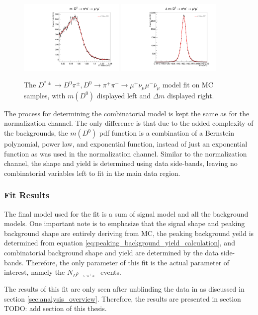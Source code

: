 \begin{figure}[htp]
    \begin{center}
      \includegraphics[width=0.45\textwidth]{figures/chapter4/signal_fit/d0pipimm_2022_2023_0_m.pdf}
      \includegraphics[width=0.45\textwidth]{figures/chapter4/signal_fit/d0pipimm_2022_2023_0_dm.pdf}\\
    \end{center}
    \caption{
      The $D^{*\pm} \to D^0\pi^\pm, D^0 \to \pi^+ \pi^- \to \mu^+ \nu_\mu \mu^- \bar{\nu}_\mu$ model fit on MC samples, with $m(D^0)$ displayed left and $\Delta m$ displayed right.
    }
    \label{fig:d0munumunu_uml_fit}
\end{figure}


The process for determining the combinatorial model is kept the same as for the normalization channel. The only difference is that due to the added complexity of the backgrounds, the $m(D^0)$ pdf function is a combination of a Bernstein polynomial, power law, and exponential function, instead of just an exponential function as was used in the normalization channel. Similar to the normalization channel, the shape and yield is determined using data side-bands, leaving no combinatorial variables left to fit in the main data region.

\subsubsection{Fit Results}

The final model used for the fit is a sum of signal model and all the background models. One important note is to emphasize that the signal shape and peaking background shape are entirely deriving from MC, the peaking background yeild is determined from equation \ref{eq:peaking_background_yield_calculation}, and combinatorial background shape and yield are determined by the data side-bands. Therefore, the only parameter of this fit is the actual parameter of interest, namely the $N_{D^0 \to \pi^+ \pi^-}$ events. 

The results of this fit are only seen after unblinding the data in as discussed in section \ref{sec:analysis_overview}. Therefore, the results are presented in section TODO: add section of this thesis. 